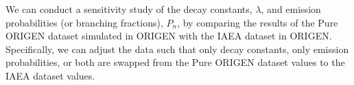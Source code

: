 \documentclass{style/nseJournal}
\begin{document}
We can conduct a sensitivity study of the decay constants, $\lambda$, and emission probabilities (or branching fractions), $P_n$, by comparing the results of the Pure ORIGEN dataset simulated in ORIGEN with the IAEA dataset in ORIGEN.
Specifically, we can adjust the data such that only decay constants, only emission probabilities, or both are swapped from the Pure ORIGEN dataset values to the IAEA dataset values.




\end{document}
